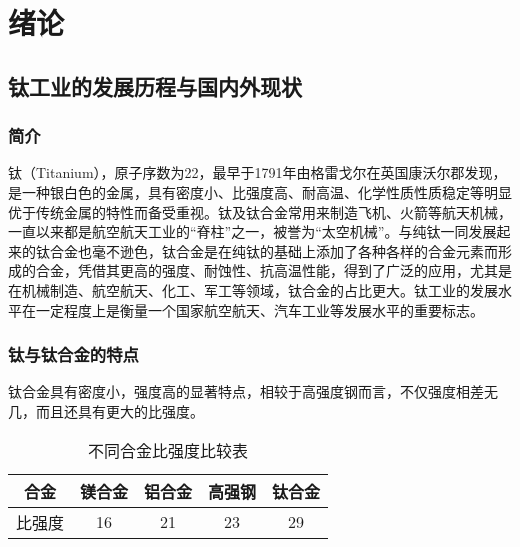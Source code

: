 \documentclass[
class = book,
zihao = -4,
font = noto,
paper = a4paper,
openany
]{easybook}
\begin{document}
	\maketitle
	\begin{abstract}
	\end{abstract}
	\tableofcontents
	\pagestyle{Xju}
	\chapter{绪论}
	\section{钛工业的发展历程与国内外现状}
	\subsection{简介}

	钛（Titanium），原子序数为22，最早于1791年由格雷戈尔在英国康沃尔郡发现，是一种银白色的金属，具有密度小、比强度高、耐高温、化学性质性质稳定等明显优于传统金属的特性而备受重视。钛及钛合金常用来制造飞机、火箭等航天机械，一直以来都是航空航天工业的“脊柱”之一，被誉为“太空机械”\cite{XJYS200102014}。与纯钛一同发展起来的钛合金也毫不逊色，钛合金是在纯钛的基础上添加了各种各样的合金元素而形成的合金，凭借其更高的强度、耐蚀性、抗高温性能，得到了广泛的应用，尤其是在机械制造、航空航天、化工、军工等领域，钛合金的占比更大。钛工业的发展水平在一定程度上是衡量一个国家航空航天、汽车工业等发展水平的重要标志\cite{HSJJ202109005}。

	\subsection{钛与钛合金的特点}
	钛合金具有密度小，强度高的显著特点，相较于高强度钢而言，不仅强度相差无几，而且还具有更大的比强度。


		\begin{table}[htbp]
		\centering
		\label{sec:bqd}
		\caption{不同合金比强度比较表}
		\begin{tabular}{ccccc}
		\hline
		\textbf{合金} & \textbf{镁合金} & \textbf{铝合金} & \textbf{高强钢} & \textbf{钛合金} \\
		\hline
		比强度 & 16 & 21 & 23 & 29 \\
		 \hline
		\end{tabular}
	\end{table}
\end{document}
